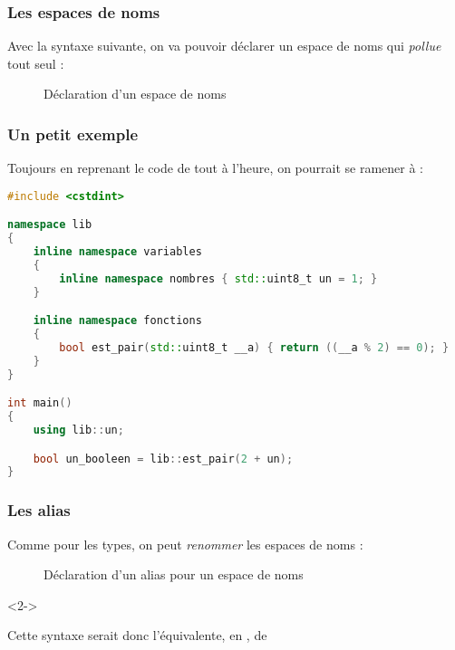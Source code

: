 \documentclass{cppcourses}
\begin{document}
\begin{frame}

\frametitle{Les espaces de noms }

Avec la syntaxe suivante, on va pouvoir déclarer un espace de noms qui \emph{pollue} tout seul  :

\begin{figure}
\caption{Déclaration d'un espace de noms }
\end{figure}

\end{frame}

\begin{frame}[fragile]

\frametitle{Un petit exemple}

\begin{example}

Toujours en reprenant le code de tout à l'heure, on pourrait se ramener à :

\begin{lstlisting}[language = c++]
#include <cstdint>

namespace lib
{
    inline namespace variables
    {
        inline namespace nombres { std::uint8_t un = 1; }
    }

    inline namespace fonctions
    {
        bool est_pair(std::uint8_t __a) { return ((__a % 2) == 0); }
    }
}

int main()
{
    using lib::un;

    bool un_booleen = lib::est_pair(2 + un);
}
\end{lstlisting}

\end{example}

\end{frame}

\begin{frame}

\frametitle{Les alias}

Comme pour les types, on peut \emph{renommer} les espaces de noms :

\begin{figure}
\caption{Déclaration d'un alias pour un espace de noms}
\end{figure}

\begin{uncoverenv}<2->

Cette syntaxe serait donc l'équivalente, en , de

\begin{figure}
\end{figure}

\end{uncoverenv}

\end{frame}
\end{document}

